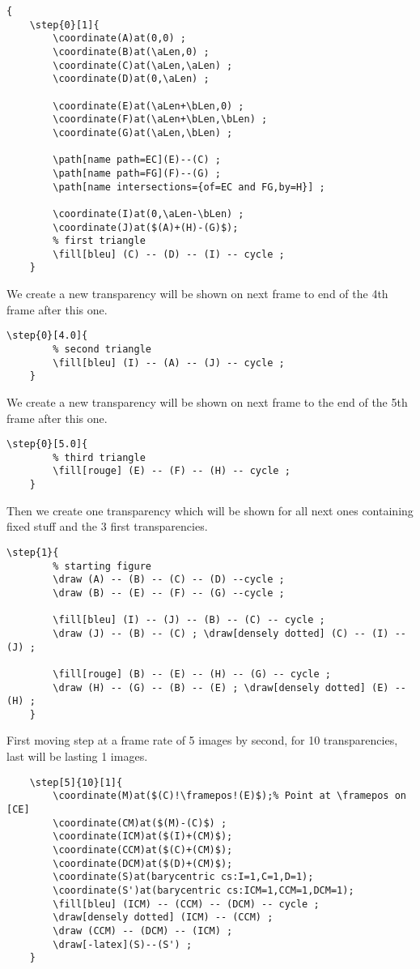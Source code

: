 \documentclass[a4paper,12pt]{article}
\begin{document}
\begin{lstlisting}[name=exemplecomplet]
{
	\step{0}[1]{		
		\coordinate(A)at(0,0) ;
		\coordinate(B)at(\aLen,0) ;
		\coordinate(C)at(\aLen,\aLen) ;
		\coordinate(D)at(0,\aLen) ;

		\coordinate(E)at(\aLen+\bLen,0) ;
		\coordinate(F)at(\aLen+\bLen,\bLen) ;
		\coordinate(G)at(\aLen,\bLen) ;

		\path[name path=EC](E)--(C) ;
		\path[name path=FG](F)--(G) ;
		\path[name intersections={of=EC and FG,by=H}] ;

		\coordinate(I)at(0,\aLen-\bLen) ;
		\coordinate(J)at($(A)+(H)-(G)$);
		% first triangle
		\fill[bleu] (C) -- (D) -- (I) -- cycle ;
	}
\end{lstlisting}

We create a new transparency will be shown on next frame to end of the 4th frame after this one.

\begin{lstlisting}[name=exemplecomplet]
	\step{0}[4.0]{
		% second triangle
		\fill[bleu] (I) -- (A) -- (J) -- cycle ;
	}
\end{lstlisting}

We create a new transparency will be shown on next frame to the end of the 5th frame after this one.

\begin{lstlisting}[name=exemplecomplet]
	\step{0}[5.0]{
		% third triangle
		\fill[rouge] (E) -- (F) -- (H) -- cycle ;
	}
\end{lstlisting}

Then we create one transparency which will be shown for all next ones containing fixed stuff and the 3 first transparencies.

\begin{lstlisting}[name=exemplecomplet]
	\step{1}{
		% starting figure
		\draw (A) -- (B) -- (C) -- (D) --cycle ;
		\draw (B) -- (E) -- (F) -- (G) --cycle ;
		
		\fill[bleu] (I) -- (J) -- (B) -- (C) -- cycle ;
		\draw (J) -- (B) -- (C) ; \draw[densely dotted] (C) -- (I) -- (J) ;
			
		\fill[rouge] (B) -- (E) -- (H) -- (G) -- cycle ;
		\draw (H) -- (G) -- (B) -- (E) ; \draw[densely dotted] (E) -- (H) ;
	}
\end{lstlisting}

First moving step at a frame rate of 5 images by second, for 10 transparencies, last will be lasting 1 images.

\begin{lstlisting}[name=exemplecomplet]
	% first triangle moves :
	\step[5]{10}[1]{
		\coordinate(M)at($(C)!\framepos!(E)$);% Point at \framepos on [CE]
		\coordinate(CM)at($(M)-(C)$) ;
		\coordinate(ICM)at($(I)+(CM)$);
		\coordinate(CCM)at($(C)+(CM)$);
		\coordinate(DCM)at($(D)+(CM)$);
		\coordinate(S)at(barycentric cs:I=1,C=1,D=1);
		\coordinate(S')at(barycentric cs:ICM=1,CCM=1,DCM=1);
		\fill[bleu] (ICM) -- (CCM) -- (DCM) -- cycle ;
		\draw[densely dotted] (ICM) -- (CCM) ;
		\draw (CCM) -- (DCM) -- (ICM) ;
		\draw[-latex](S)--(S') ;
	}
\end{lstlisting}
\end{document}
